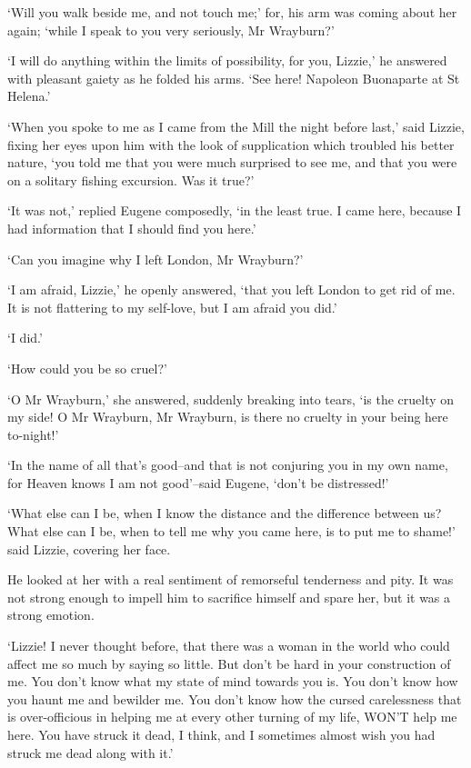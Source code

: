 ‘Will you walk beside me, and not touch me;’ for, his arm was coming
about her again; ‘while I speak to you very seriously, Mr Wrayburn?’

‘I will do anything within the limits of possibility, for you, Lizzie,’
he answered with pleasant gaiety as he folded his arms. ‘See here!
Napoleon Buonaparte at St Helena.’

‘When you spoke to me as I came from the Mill the night before last,’
said Lizzie, fixing her eyes upon him with the look of supplication
which troubled his better nature, ‘you told me that you were much
surprised to see me, and that you were on a solitary fishing excursion.
Was it true?’

‘It was not,’ replied Eugene composedly, ‘in the least true. I came
here, because I had information that I should find you here.’

‘Can you imagine why I left London, Mr Wrayburn?’

‘I am afraid, Lizzie,’ he openly answered, ‘that you left London to get
rid of me. It is not flattering to my self-love, but I am afraid you
did.’

‘I did.’

‘How could you be so cruel?’

‘O Mr Wrayburn,’ she answered, suddenly breaking into tears, ‘is the
cruelty on my side! O Mr Wrayburn, Mr Wrayburn, is there no cruelty in
your being here to-night!’

‘In the name of all that’s good--and that is not conjuring you in my
own name, for Heaven knows I am not good’--said Eugene, ‘don’t be
distressed!’

‘What else can I be, when I know the distance and the difference between
us? What else can I be, when to tell me why you came here, is to put me
to shame!’ said Lizzie, covering her face.

He looked at her with a real sentiment of remorseful tenderness and
pity. It was not strong enough to impell him to sacrifice himself and
spare her, but it was a strong emotion.

‘Lizzie! I never thought before, that there was a woman in the world who
could affect me so much by saying so little. But don’t be hard in your
construction of me. You don’t know what my state of mind towards you is.
You don’t know how you haunt me and bewilder me. You don’t know how the
cursed carelessness that is over-officious in helping me at every other
turning of my life, WON’T help me here. You have struck it dead, I
think, and I sometimes almost wish you had struck me dead along with
it.’

